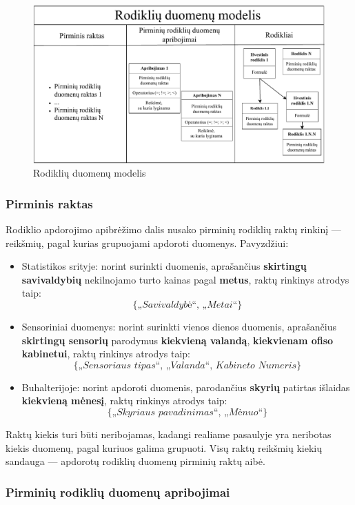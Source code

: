 \documentclass{VUMIFPSbakalaurinis}
\begin{document}
\begin{figure}[H]
    \includegraphics[width=1\textwidth]{img/rodiklio_modelis.pdf}
    \caption{Rodiklių duomenų modelis}
    \label{img:rodiklio_apibrezimas}
\end{figure}

\subsubsection{Pirminis raktas}

Rodiklio apdorojimo apibrėžimo dalis nusako pirminių rodiklių raktų rinkinį — reikšmių, pagal kurias grupuojami apdoroti duomenys. Pavyzdžiui:
\begin{itemize}
    \item Statistikos srityje: norint surinkti duomenis, aprašančius \textbf{skirtingų savivaldybių} nekilnojamo turto kainas pagal \textbf{metus}, raktų rinkinys atrodys taip: \[\{\textit{„Savivaldybė“, „Metai“}\}\]
    \item Sensoriniai duomenys: norint surinkti vienos dienos duomenis, aprašančius \textbf{skirtingų sensorių} parodymus \textbf{kiekvieną valandą}, \textbf{kiekvienam ofiso kabinetui}, raktų rinkinys atrodys taip: \[\{\textit{„Sensoriaus tipas“, „Valanda“, Kabineto Numeris}\}\] 
    \item Buhalterijoje: norint apdoroti duomenis, parodančius \textbf{skyrių} patirtas išlaidas \textbf{kiekvieną mėnesį}, raktų rinkinys atrodys taip: \[\{\textit{„Skyriaus pavadinimas“, „Mėnuo“}\}\] 
\end{itemize}  \par
Raktų kiekis turi būti neribojamas, kadangi realiame pasaulyje yra neribotas kiekis duomenų, pagal kuriuos galima grupuoti. Visų raktų reikšmių kiekių sandauga — apdorotų rodiklių duomenų pirminių raktų aibė. 

\subsubsection{Pirminių rodiklių duomenų apribojimai}
\end{document}
